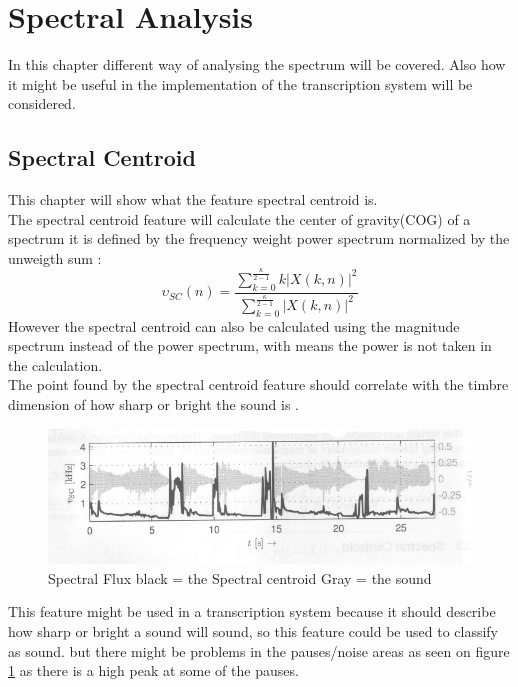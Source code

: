 \section{Spectral Analysis}
In this chapter different way of analysing the spectrum will be covered. Also how it might be useful in the implementation of the transcription system will be considered.
\subsection{Spectral Centroid}
This chapter will show what the feature spectral centroid is.\\
The spectral centroid feature will calculate the center of gravity(COG) of a spectrum it is defined by the frequency weight power spectrum normalized by the unweigth sum \citep{ACA}:
\begin{equation}\label{Spectral Centroid eq}
	\upsilon_{SC}(n) = \frac{\displaystyle\sum_{k = 0}^{\frac{\kappa}{2-1}} k\vert X(k,n) \vert^2}{\displaystyle\sum_{k = 0}^{\frac{\kappa}{2-1}} \vert X(k,n) \vert^2 }    
\end{equation} 
However the spectral centroid can also be calculated using the magnitude spectrum instead of the power spectrum, with means the power is not taken in the calculation\citep{ACA}.
\\
The point found by the spectral centroid feature should correlate with the timbre dimension of how sharp or bright the sound is \citep{ACA}. 

\begin{figure}[h]
	\begin{center}
		\includegraphics[scale = 0.5]{fig/spectral_centroid.jpg}
		\caption{Spectral Flux black = the Spectral centroid Gray = the sound \citep{ACA}}
		\label{Spectral centroid pic}
	\end{center}
\end{figure}
This feature might be used in a transcription system because it should describe how sharp or bright a sound will sound, so this feature could be used to classify as sound. but there might be problems in the pauses/noise areas as seen on figure \ref{Spectral centroid pic} as there is a high peak at some of the pauses. 
